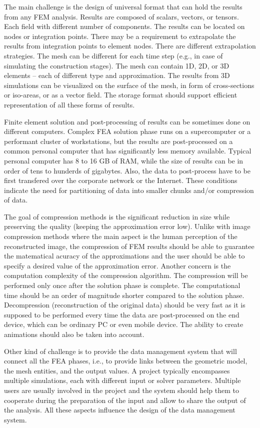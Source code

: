 The main challenge is the design of universal format that can hold the results from any FEM analysis. Results are composed of scalars, vectors, or tensors. Each field with different number of components. The results can be located on nodes or integration points. There may be a requirement to extrapolate the results from integration points to element nodes. There are different extrapolation strategies. The mesh can be different for each time step (e.g., in case of simulating the construction stages). The mesh can contain 1D, 2D, or 3D elements -- each of different type and approximation. The results from 3D simulations can be visualized on the surface of the mesh, in form of cross-sections or iso-areas, or as a vector field. The storage format should support efficient representation of all these forms of results.

Finite element solution and post-processing of results can be sometimes done on different computers. Complex FEA solution phase runs on a supercomputer or a performant cluster of workstations, but the results are post-processed on a common personal computer that has significantly less memory available. Typical personal computer has 8 to 16 GB of RAM, while the size of results can be in order of tens to hunderds of gigabytes. Also, the data to post-process have to be first transfered over the corporate network or the Internet. These conditions indicate the need for partitioning of data into smaller chunks and/or compression of data.

The goal of compression methods is the significant reduction in size while preserving the quality (keeping the approximation error low). Unlike with image compression methods where the main aspect is the human perception of the reconstructed image, the compression of FEM results should be able to guarantee the matematical acuracy of the approximations and the user should be able to specify a desired value of the approximation error. Another concern is the computation complexity of the compression algorithm. The compression will be performed only once after the solution phase is complete. The computational time should be an order of magnitude shorter compared to the solution phase. Decompression (reconstruction of the original data) should be very fast as it is supposed to be performed every time the data are post-processed on the end device, which can be ordinary PC or even mobile device. The ability to create animations should also be taken into account.

Other kind of challenge is to provide the data management system that will connect all the FEA phases, i.e., to provide links between the geometric model, the mesh entities, and the output values. A project typically encompasses multiple simulations, each with different input or solver parameters. Multiple users are usually involved in the project and the system should help them to cooperate during the preparation of the input and allow to share the output of the analysis. All these aspects influence the design of the data management system.

